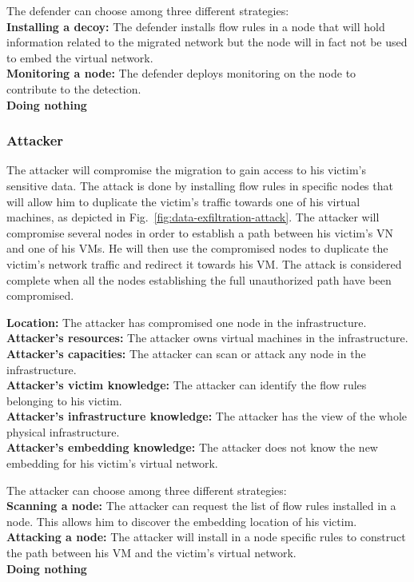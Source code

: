 The defender can choose among three different strategies:\\
\textbf{Installing a decoy: } The defender installs flow rules in a node that will hold information related to the migrated network but the node will in fact not be used to embed the virtual network.\\
\textbf{Monitoring a node: } The defender deploys monitoring on the node to contribute to the detection.\\
\textbf{Doing nothing}

\subsubsection{Attacker}
The attacker will compromise the migration to gain access to his victim's sensitive data.
The attack is done by installing flow rules in specific nodes that will allow him to duplicate the victim's traffic towards one of his virtual machines, as depicted in Fig.~\ref{fig:data-exfiltration-attack}. 
The attacker will compromise several nodes in order to establish a path between his victim's VN and one of his VMs.
He will then use the compromised nodes to duplicate the victim's network traffic and redirect it towards his VM.
The attack is considered complete when all the nodes establishing the full unauthorized path have been compromised.

\textbf{Location: } The attacker has compromised one node in the infrastructure.\\
\textbf{Attacker's resources: } The attacker owns virtual machines in the infrastructure.\\
\textbf{Attacker's capacities: } The attacker can scan or attack any node in the infrastructure.\\
\textbf{Attacker's victim knowledge: } The attacker can identify the flow rules belonging to his victim.\\
\textbf{Attacker's infrastructure knowledge: } The attacker has the view of the whole physical infrastructure.\\
\textbf{Attacker's embedding knowledge: } The attacker does not know the new embedding for his victim's virtual network.


The attacker can choose among three different strategies:\\
\textbf{Scanning a node: } The attacker can request the list of  flow rules installed in a node. This allows him to discover the embedding location of his victim.\\
\textbf{Attacking a node: } The attacker will install in a node specific rules to construct the path between his VM and the victim's virtual network.\\
\textbf{Doing nothing}\\



